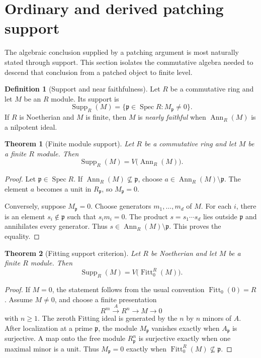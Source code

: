 \documentclass[11pt]{amsart}
\newtheorem{theorem}{Theorem}[section]
\theoremstyle{definition}
\newtheorem{definition}[definition]{Definition}
\theoremstyle{remark}
\newcommand{\Spec}{\operatorname{Spec}}
\newcommand{\Supp}{\operatorname{Supp}}
\newcommand{\Ann}{\operatorname{Ann}}
\newcommand{\Fitt}{\operatorname{Fitt}}
\newcommand{\frakp}{\mathfrak p}
\begin{document}
\section{Ordinary and derived patching support}\label{sec:patching_support}

The algebraic conclusion supplied by a patching argument is most naturally stated through support. This section isolates the commutative algebra needed to descend that conclusion from a patched object to finite level.

\begin{definition}[Support and near faithfulness]\label{def:support_near_faithful}
Let \(R\) be a commutative ring and let \(M\) be an \(R\) module. Its support is
\[
\Supp_R(M)
=
\{\frakp\in\Spec R:M_{\frakp}\neq0\}.
\]
If \(R\) is Noetherian and \(M\) is finite, then \(M\) is \emph{nearly faithful} when \(\Ann_R(M)\) is a nilpotent ideal.
\end{definition}

\begin{theorem}[Finite module support]\label{thm:finite_module_support}
Let \(R\) be a commutative ring and let \(M\) be a finite \(R\) module. Then
\[
\boxed{
\Supp_R(M)
=
V\bigl(\Ann_R(M)\bigr).
}
\]
\end{theorem}

\begin{proof}
Let \(\frakp\in\Spec R\). If \(\Ann_R(M)\not\subseteq\frakp\), choose
\(a\in\Ann_R(M)\setminus\frakp\). The element \(a\) becomes a unit in
\(R_{\frakp}\), so \(M_{\frakp}=0\).

Conversely, suppose \(M_{\frakp}=0\). Choose generators
\(m_1,\ldots,m_d\) of \(M\). For each \(i\), there is an element
\(s_i\notin\frakp\) such that \(s_im_i=0\). The product
\(s=s_1\cdots s_d\) lies outside \(\frakp\) and annihilates every generator.
Thus \(s\in\Ann_R(M)\setminus\frakp\). This proves the equality.
\end{proof}

\begin{theorem}[Fitting support criterion]\label{thm:fitting_support}
Let \(R\) be Noetherian and let \(M\) be a finite \(R\) module. Then
\[
\boxed{
\Supp_R(M)
=
V\bigl(\Fitt_0^R(M)\bigr).
}
\]
\end{theorem}

\begin{proof}
If \(M=0\), the statement follows from the usual convention \(\Fitt_0(0)=R\). Assume \(M\neq0\), and choose a finite presentation
\[
R^m\xrightarrow{A}R^n\longrightarrow M\longrightarrow0
\]
with \(n\geq1\).
The zeroth Fitting ideal is generated by the \(n\) by \(n\) minors of \(A\). After localization at a prime \(\frakp\), the module \(M_{\frakp}\) vanishes exactly when \(A_{\frakp}\) is surjective. A map onto the free module \(R_{\frakp}^n\) is surjective exactly when one maximal minor is a unit. Thus \(M_{\frakp}=0\) exactly when \(\Fitt_0^R(M)\not\subseteq\frakp\).
\end{proof}
\end{document}
